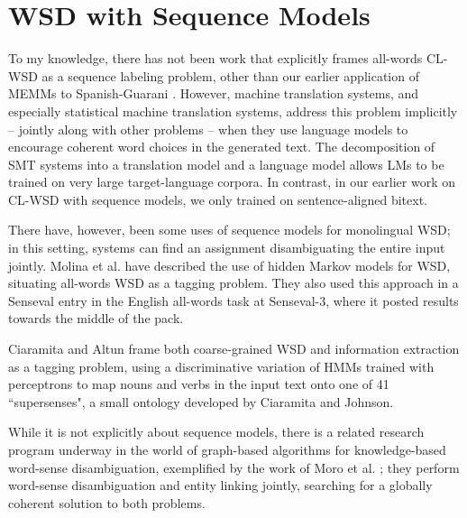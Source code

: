 \section{WSD with Sequence Models}
To my knowledge, there has not been work that explicitly frames all-words
CL-WSD as a sequence labeling problem, other than our earlier application of
MEMMs to Spanish-Guarani \cite{rudnick-gasser:2013:HyTra}.  However, machine
translation systems, and especially statistical machine translation systems,
address this problem implicitly -- jointly along with other problems -- when
they use language models to encourage coherent word choices in the generated
text. The decomposition of SMT systems into a translation model and a language
model allows LMs to be trained on very large target-language corpora.  In
contrast, in our earlier work on CL-WSD with sequence models, we only trained
on sentence-aligned bitext.

There have, however, been some uses of sequence models for monolingual WSD; in
this setting, systems can find an assignment disambiguating the entire input
jointly.  Molina et al. \cite{DBLP:conf/iberamia/MolinaPS02} have described the
use of hidden Markov models for WSD, situating all-words WSD as a tagging
problem.  They also used this approach in a Senseval entry
\cite{molina-pla-segarra:2004:Senseval-3} in the English all-words task at
Senseval-3, where it posted results towards the middle of the pack.

Ciaramita and Altun \cite{ciaramita-altun:2006:EMNLP} frame both coarse-grained
WSD and information extraction as a tagging problem, using a discriminative
variation of HMMs trained with perceptrons \cite{collins:2002:EMNLP02}
to map nouns and verbs in the input text onto one of 41 ``supersenses", a
small ontology developed by Ciaramita and Johnson.

While it is not explicitly about sequence models, there is a related research
program underway in the world of graph-based algorithms for knowledge-based
word-sense disambiguation, exemplified by the work of Moro et al.
\cite{DBLP:journals/tacl/0001RN14}; they perform word-sense disambiguation and
entity linking jointly, searching for a globally coherent solution to both
problems.

